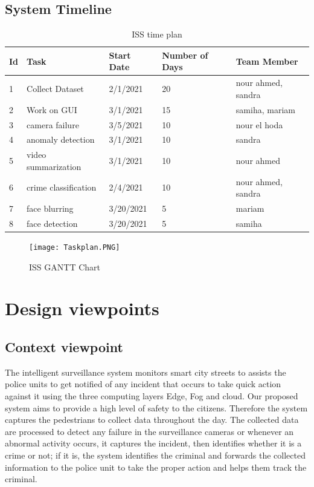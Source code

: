 \documentclass[12pt]{article}
\begin{document}
\subsection {System Timeline}

\begin{table}[htbp]
\centering
\caption{ISS time plan}
\label{tab:Time Plan}
\begin{tabular}{|l|l|l|l|l|}
\hline
Id & Task               & Start Date & Number of Days & Team Member \\ \hline
1  & Collect Dataset    & 2/1/2021 & 20           & nour ahmed, sandra        \\ \hline
2  & Work on GUI        & 3/1/2021 & 15             & samiha, mariam        \\ \hline
3  & camera failure    & 3/5/2021 & 10              & nour el hoda          \\ \hline
4  &  anomaly detection & 3/1/2021 & 10             & sandra    \\ \hline
5  & video summarization     & 3/1/2021 & 10             & nour ahmed           \\ \hline
6  & crime classification     & 2/4/2021 & 10    & nour ahmed, sandra          \\ \hline
7  &   face blurring   & 3/20/2021 & 5             & mariam     \\ \hline
8  &   face detection    & 3/20/2021 & 5             & samiha    \\ \hline
\end{tabular}
\end{table}

\begin{figure}[htbp]
\centering
\texttt{[image: Taskplan.PNG]}
\caption{ISS GANTT Chart}
\label{fig:GANTT Chart}
\end{figure}

\clearpage
\section{Design viewpoints} 
\subsection{ Context viewpoint}
The intelligent surveillance system monitors smart city streets to assists the police units to get notified of any incident that occurs to take quick action against it using the three computing layers Edge, Fog and cloud. Our proposed system aims to provide a high level of safety to the citizens. Therefore the system captures the pedestrians to collect data throughout the day. The collected data are processed to detect any failure in the surveillance cameras or whenever an abnormal activity occurs, it captures the incident, then identifies whether it is a crime or not; if it is, the system identifies the criminal and forwards the collected information to the police unit to take the proper action and helps them track the criminal.
\end{document}
